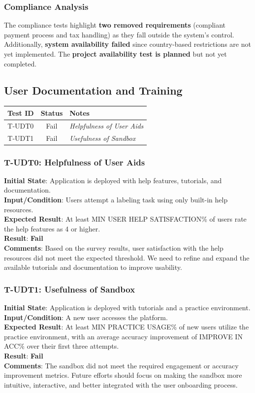 \documentclass[12pt, titlepage]{article}
\begin{document}
\subsubsection{Compliance Analysis}
The compliance tests highlight \textbf{two removed requirements} (compliant payment process and tax handling) as they fall outside the system’s control. Additionally, \textbf{system availability failed} since country-based restrictions are not yet implemented. The \textbf{project availability test is planned} but not yet completed.
\subsection{User Documentation and Training}
\begin{longtable}{|c|c|l|}
    \hline
    \textbf{Test ID} & \textbf{Status} & \textbf{Notes} \\
    \hline
    T-UDT0 & Fail & \textit{Helpfulness of User Aids} \\
    T-UDT1 & Fail & \textit{Usefulness of Sandbox} \\
    \hline
\end{longtable}

\subsubsection{T-UDT0: Helpfulness of User Aids}
\textbf{Initial State}: Application is deployed with help features, tutorials, and documentation.\\
\textbf{Input/Condition}: Users attempt a labeling task using only built-in help resources.\\
\textbf{Expected Result}: At least MIN USER HELP SATISFACTION\% of users rate the help features as 4 or higher.\\
\textbf{Result}: \textbf{Fail}\\
\textbf{Comments}: Based on the survey results, user satisfaction with the help resources did not meet the expected threshold. We need to refine and expand the available tutorials and documentation to improve usability.

\subsubsection{T-UDT1: Usefulness of Sandbox}
\textbf{Initial State}: Application is deployed with tutorials and a practice environment.\\
\textbf{Input/Condition}: A new user accesses the platform.\\
\textbf{Expected Result}: At least MIN PRACTICE USAGE\% of new users utilize the practice environment, with an average accuracy improvement of IMPROVE IN ACC\% over their first three attempts.\\
\textbf{Result}: \textbf{Fail}\\
\textbf{Comments}: The sandbox did not meet the required engagement or accuracy improvement metrics. Future efforts should focus on making the sandbox more intuitive, interactive, and better integrated with the user onboarding process.
\end{document}
